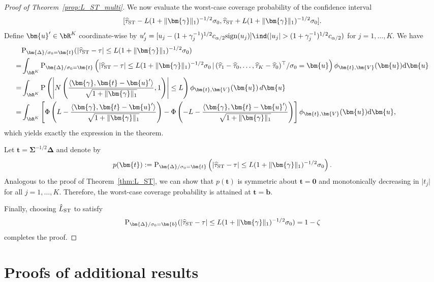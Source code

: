 \documentclass[11pt]{article}
\def\given{\,|\,}
\def\P{{\mathrm P}}
\def\d{{\mathrm d}}
\newcommand{\htau}{\widehat\tau}
\numberwithin{equation}{section}
\theoremstyle{definition}
\begin{document}
\begin{proof}[Proof of Theorem~\ref{prop:L_ST_multi}]
We now evaluate the worst-case coverage probability of the confidence interval
\[
  [\htau_{\rm ST} - L (1+\lVert \bm{\gamma} \rVert_1)^{-1/2} \sigma_0, \htau_{\rm ST} + L (1+\lVert \bm{\gamma} \rVert_1)^{-1/2} \sigma_0].
\]
Define $\bm{u}'\in\bR^K$ coordinate-wise by $u_j' = [u_j - (1+\gamma_j^{-1})^{1/2} c_{\alpha/2} {\rm sign}(u_j)] \ind(\lvert u_j \rvert > (1+\gamma_j^{-1})^{1/2} c_{\alpha/2})$ for $j=1,\ldots,K$. We have
\begin{align*}
  &\P_{\bm{\Delta}/\sigma_0 = \bm{t}}(\lvert \htau_{\rm ST}- \tau \rvert \le L (1+\lVert \bm{\gamma} \rVert_1)^{-1/2} \sigma_0)\\
  =& \int_{\bR^K} \P_{\bm{\Delta}/\sigma_0 = \bm{t}}\left(\lvert \htau_{\rm ST}- \tau \rvert \le L (1+\lVert \bm{\gamma} \rVert_1)^{-1/2} \sigma_0 \given (\htau_1 - \htau_0, \ldots, \htau_K - \htau_0)^\top/\sigma_0 = \bm{u}\right) \phi_{\bm{t}, \bm{V}}(\bm{u}) \d \bm{u}\\
  =& \int_{\bR^K}
  \P\left(
    \left\lvert N\left(\frac{\langle \bm{\gamma},\bm{t}-\bm{u}'\rangle}{\sqrt{1+\lVert \bm{\gamma}\rVert_1}},1\right)\right\rvert
    \le L
  \right)
  \phi_{\bm{t},\bm{V}}(\bm{u})\,d\bm{u} \\
  =& \int_{\bR^K} \left[\Phi\left(L - \frac{\langle \bm{\gamma}, \bm{t} - \bm{u}' \rangle}{\sqrt{1+\lVert \bm{\gamma} \rVert_1}}  \right) - \Phi\left(-L - \frac{\langle \bm{\gamma}, \bm{t} - \bm{u}' \rangle}{\sqrt{1+\lVert \bm{\gamma} \rVert_1}} \right)\right] \phi_{\bm{t}, \bm{V}}(\bm{u}) \d \bm{u},
\end{align*}
which yields exactly the expression in the theorem.

Let $\bm{t}=\bm{\Sigma}^{-1/2}\bm{\Delta}$ and denote by
\[
p(\bm{t})
:=\P_{\bm{\Delta}/\sigma_0=\bm{t}}\left(
\lvert \htau_{\rm ST}-\tau \rvert
\le L(1+\lVert\bm{\gamma}\rVert_1)^{-1/2}\sigma_0
\right).
\]
Analogous to the proof of Theorem~\ref{thm:L_ST}, we can show that $p(\bm{t})$ is symmetric about $\bm{t} = \bm{0}$ and monotonically decreasing in $\lvert t_j \rvert$ for all $j=1,\ldots,K$. Therefore, the worst-case coverage probability is attained at $\bm{t} = \bm{b}$.

Finally, choosing $\hat L_{\rm ST}$ to satisfy
\[
  \P_{\bm{\Delta}/\sigma_0 = \bm{b}}(\lvert \htau_{\rm ST}- \tau \rvert \le L (1+\lVert \bm{\gamma} \rVert_1)^{-1/2} \sigma_0) = 1-\zeta
\]
completes the proof.
  
\end{proof}


\section{Proofs of additional results}\label{sec:proof_additional}
\end{document}
